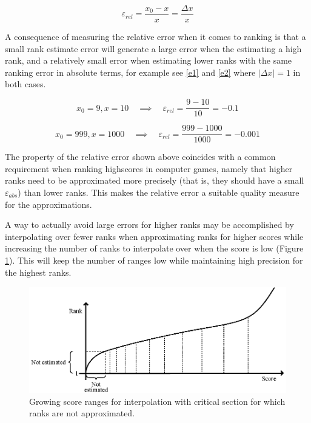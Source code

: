 \begin{equation}
  \label{rel-error}
  \varepsilon_{rel} = \frac{x_0 - x}{x} = \frac{\Delta x}{x} 
\end{equation}

A consequence of measuring the relative error when it comes to ranking is that a small rank estimate error will generate a large error when the estimating a high rank, and a relatively small error when estimating lower ranks with the same ranking error in absolute terms, for example see \ref{e1} and \ref{e2} where $|\Delta x| = 1$ in both cases.

\begin{equation}
  \label{e1}
x_0 = 9, x = 10 \quad \implies \quad \varepsilon_{rel} = \frac{9 - 10}{10} = -0.1  
\end{equation}

\begin{equation}
  \label{e2}
x_0 = 999, x = 1000 \quad \implies \quad \varepsilon_{rel} = \frac{999 - 1000}{1000} = -0.001  
  \end{equation}

The property of the relative error shown above coincides with a common requirement when ranking highscores in computer games, namely that higher ranks need to be approximated more precisely (that is, they should have a small $\varepsilon_{abs}$) than lower ranks. This makes the relative error a suitable quality measure for the approximations.

A way to actually avoid large errors for higher ranks may be accomplished by interpolating over fewer ranks when approximating ranks for higher scores while  increasing the number of ranks to interpolate over when the score is low (Figure \ref{fig:growing}).  This will keep the number of ranges low while maintaining high precision for the highest ranks.

\begin{figure}[h!]
  \centering
  \caption{Growing score ranges for interpolation with critical section for which ranks are not approximated.}
  \label{fig:growing}
  \includegraphics[width=13cm]{img/growing_bucket_sizes.eps}
\end{figure}

